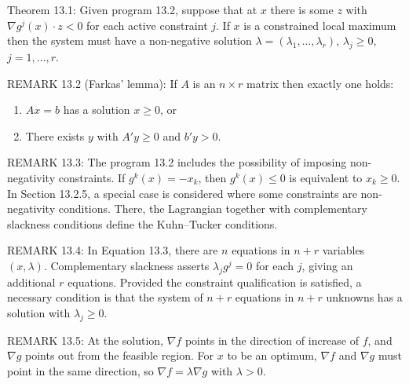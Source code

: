 \begin{original}
Theorem 13.1: Given program 13.2, suppose that at $x$ there is some $z$ with $\nabla g^j(x) \cdot z < 0$ for each active constraint $j$. If $x$ is a constrained local maximum then the system must have a non-negative solution $\lambda = (\lambda_1,\dots,\lambda_r)$, $\lambda_j \ge 0$, $j = 1,\dots, r$.

REMARK 13.2 (Farkas' lemma): If $A$ is an $n \times r$ matrix then exactly one holds:
\begin{enumerate}
\item $Ax = b$ has a solution $x \ge 0$, or
\item There exists $y$ with $A'y \ge 0$ and $b'y > 0$.
\end{enumerate}

REMARK 13.3: The program 13.2 includes the possibility of imposing non-negativity constraints. If $g^k(x) = -x_k$, then $g^k(x) \le 0$ is equivalent to $x_k \ge 0$. In Section 13.2.5, a special case is considered where some constraints are non-negativity conditions. There, the Lagrangian together with complementary slackness conditions define the Kuhn--Tucker conditions.

REMARK 13.4: In Equation 13.3, there are $n$ equations in $n+r$ variables $(x,\lambda)$. Complementary slackness asserts $\lambda_j g^j = 0$ for each $j$, giving an additional $r$ equations. Provided the constraint qualification is satisfied, a necessary condition is that the system of $n+r$ equations in $n+r$ unknowns has a solution with $\lambda_j \ge 0$.

REMARK 13.5: At the solution, $\nabla f$ points in the direction of increase of $f$, and $\nabla g$ points out from the feasible region. For $x$ to be an optimum, $\nabla f$ and $\nabla g$ must point in the same direction, so $\nabla f = \lambda \nabla g$ with $\lambda > 0$.
\end{original}
